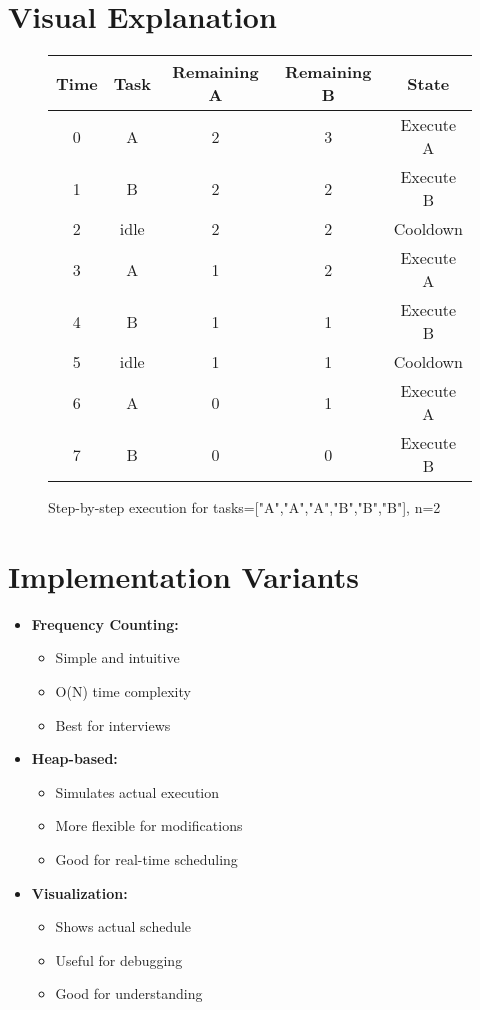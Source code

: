 \section*{Visual Explanation}
\begin{figure}[h]
    \centering
    \begin{tabular}{|c|c|c|c|c|}
        \hline
        Time & Task & Remaining A & Remaining B & State \\
        \hline
        0 & A & 2 & 3 & Execute A \\
        1 & B & 2 & 2 & Execute B \\
        2 & idle & 2 & 2 & Cooldown \\
        3 & A & 1 & 2 & Execute A \\
        4 & B & 1 & 1 & Execute B \\
        5 & idle & 1 & 1 & Cooldown \\
        6 & A & 0 & 1 & Execute A \\
        7 & B & 0 & 0 & Execute B \\
        \hline
    \end{tabular}
    \caption{Step-by-step execution for tasks=["A","A","A","B","B","B"], n=2}
    \label{fig:task_scheduler}
\end{figure}

\section*{Implementation Variants}
\begin{itemize}
    \item \textbf{Frequency Counting:}
        \begin{itemize}
            \item Simple and intuitive
            \item O(N) time complexity
            \item Best for interviews
        \end{itemize}
    \item \textbf{Heap-based:}
        \begin{itemize}
            \item Simulates actual execution
            \item More flexible for modifications
            \item Good for real-time scheduling
        \end{itemize}
    \item \textbf{Visualization:}
        \begin{itemize}
            \item Shows actual schedule
            \item Useful for debugging
            \item Good for understanding
        \end{itemize}
\end{itemize}


